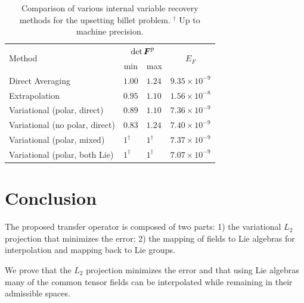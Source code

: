 \documentclass[12pt]{article}
\begin{document}
\begin{table}[htbp]
  \begin{center}
    \begin{tabular}{ l l l l }
      \toprule
      \multirow{2}{*}{Method}
      &
      \multicolumn{2}{c}{$\det {\boldsymbol{F}}^{p}$}
      & 
      \multicolumn{1}{c}{\multirow{2}{*}{$E_{F}$}}
      \\
      &
      \multicolumn{1}{c}{min}
      &
      \multicolumn{1}{c}{max}
      &
      \\
      \hline
      Direct Averaging
      &
      $1.00$
      & 
      $1.24$
      & 
      $9.35 \times 10^{-9}$
      \\
      Extrapolation   
      &
      $0.95$
      &
      $1.10$
      &
      $1.56 \times 10^{-8}$
      \\
      Variational (polar, direct)
      &
      $0.89$
      & 
      $1.10$
      & 
      $7.36 \times 10^{-9}$
      \\
      Variational (no polar, direct)
      &
      $0.83$
      & 
      $1.24$
      & 
      $7.40 \times 10^{-9}$
      \\
      Variational (polar, mixed)  
      &
      $1^\dagger$
      & 
      $1^\dagger$
      & 
      $7.37 \times 10^{-9}$
      \\
      Variational (polar, both Lie)  
      &
      $1^\dagger$
      & 
      $1^\dagger$
      & 
      $7.07 \times 10^{-9}$
      \\
      \bottomrule
    \end{tabular}
    \caption{Comparison of various internal variable recovery methods
      for the upsetting billet problem. $^\dagger$ Up to machine precision.}
    \label{tab:billet-error-comparison}
  \end{center}
\end{table}

\section{Conclusion}

The proposed transfer operator is composed of two parts: 1) the variational
$L_2$ projection that minimizes the error; 2) the mapping of fields to Lie
algebras for interpolation and mapping back to Lie groups.

We prove that the $L_2$ projection minimizes the error and that using Lie
algebras many of the common tensor fields can be interpolated while remaining in
their admissible spaces.
\end{document}

